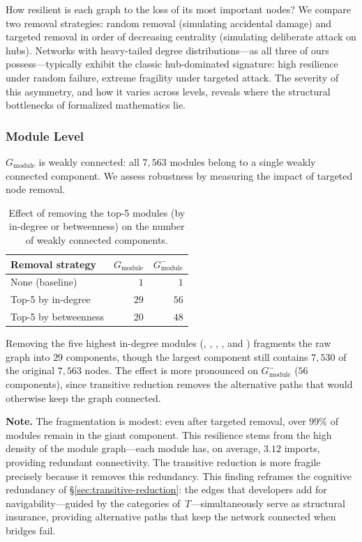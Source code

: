 How resilient is each graph to the loss of its most important nodes? We compare two removal strategies: random removal (simulating accidental damage) and targeted removal in order of decreasing centrality (simulating deliberate attack on hubs). Networks with heavy-tailed degree distributions---as all three of ours possess---typically exhibit the classic hub-dominated signature: high resilience under random failure, extreme fragility under targeted attack. The severity of this asymmetry, and how it varies across levels, reveals where the structural bottlenecks of formalized mathematics lie.

\subsubsection{Module Level}
\label{sec:robustness}

$G_{\mathrm{module}}$ is weakly connected: all $7{,}563$ modules belong to a single weakly connected component. We assess robustness by measuring the impact of targeted node removal.

\begin{table}[H]
\centering
\caption{Effect of removing the top-5 modules (by in-degree or betweenness) on the number of weakly connected components.}
\label{tab:robustness}
\begin{tabular}{lrr}
\toprule
Removal strategy & \multicolumn{1}{c}{$G_{\mathrm{module}}$} & \multicolumn{1}{c}{$G_{\mathrm{module}}^{-}$} \\
\midrule
None (baseline)          & $1$  & $1$  \\
Top-5 by in-degree       & $29$ & $56$ \\
Top-5 by betweenness     & $20$ & $48$ \\
\bottomrule
\end{tabular}
\end{table}

Removing the five highest in-degree modules (, , , , and ) fragments the raw graph into $29$ components, though the largest component still contains $7{,}530$ of the original $7{,}563$ nodes. The effect is more pronounced on $G_{\mathrm{module}}^{-}$ ($56$ components), since transitive reduction removes the alternative paths that would otherwise keep the graph connected.

\noindent\textbf{Note.}
\label{rem:robustness}
The fragmentation is modest: even after targeted removal, over $99\%$ of modules remain in the giant component. This resilience stems from the high density of the module graph---each module has, on average, $3.12$ imports, providing redundant connectivity. The transitive reduction is more fragile precisely because it removes this redundancy.
This finding reframes the cognitive redundancy of \S\ref{sec:transitive-reduction}: the edges that developers add for navigability---guided by the categories of~$T$---simultaneously serve as structural insurance, providing alternative paths that keep the network connected when bridges fail.

